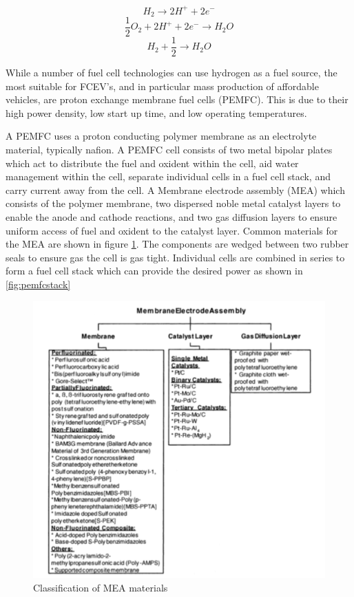 \begin{equation} \label{pemfcanode}
    H_2 \rightarrow 2H^+ + 2e^-
\end{equation}
\begin{equation} \label{pemfccathode}
    \frac{1}{2}O_2 + 2H^+ + 2e^- \rightarrow H_2 O
\end{equation}
\begin{equation} \label{pemfcall}
    H_2 + \frac{1}{2} \rightarrow H_2O
\end{equation}

While a number of fuel cell technologies can use hydrogen as a fuel source, the most suitable for FCEV's, and in particular mass production of affordable vehicles, are proton exchange membrane fuel cells (PEMFC). This is due to their high power density, low start up time, and low operating temperatures. \cite{Alaswad2016}

A PEMFC uses a proton conducting polymer membrane as an electrolyte material, typically nafion. A PEMFC cell consists of two metal bipolar plates which act to distribute the fuel and oxident within the cell, aid water management within the cell, separate individual cells in a fuel cell stack, and carry current away from the cell. \cite{Alaswad2016} A Membrane electrode assembly (MEA) which consists of the polymer membrane, two dispersed noble metal catalyst layers to enable the anode and cathode reactions, and two gas diffusion layers to ensure uniform access of fuel and oxident to the catalyst layer. Common materials for the MEA are shown in figure \ref{fig:MEA}\cite{Mehta2003}. The components are wedged between two rubber seals to ensure gas the cell is gas tight. Individual cells are combined in series to form a fuel cell stack which can provide the desired power as shown in \ref{fig:pemfcstack}

\begin{figure}[H]
    \includegraphics[scale=0.7]{figures/MEA.png}
    \caption{Classification of MEA materials \cite{Mehta2003}}
    \label{fig:MEA}
\end{figure}

